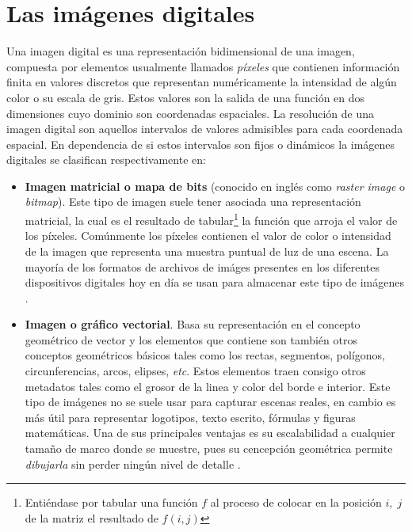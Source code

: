 \section{Las im\'agenes digitales}\label{sec:digital_images}
Una imagen digital \cite{solomon2011fundamentals,enwiki:di,eswiki:id} es una representaci\'on bidimensional de una imagen, compuesta por elementos usualmente llamados \textit{p\'ixeles} que contienen informaci\'on finita en valores discretos que representan num\'ericamente la intensidad de alg\'un color o su escala de gris. Estos valores son la salida de una funci\'on en dos dimensiones cuyo dominio son coordenadas espaciales. La resolución de una imagen digital son aquellos intervalos de valores admisibles para cada coordenada espacial. En dependencia de si estos intervalos son fijos o din\'amicos la im\'agenes digitales se clasifican respectivamente en:
\begin{itemize}
	\item \textbf{Imagen matricial o mapa de bits} (conocido en ingl\'es como \textit{raster image} o \textit{bitmap}). Este tipo de imagen suele tener asociada una representaci\'on matricial, la cual es el resultado de tabular\footnote{Entiéndase por tabular una funci\'on $f$ al proceso de colocar en la posici\'on $i,\;j$ de la matriz el resultado de $f(i, j)$} la funci\'on que arroja el valor de los p\'ixeles. Comúnmente los píxeles contienen el valor de color o intensidad de la imagen que representa una muestra puntual de luz de una escena. La mayor\'ia de los formatos de archivos de im\'ages presentes en los diferentes dispositivos digitales hoy en d\'ia se usan para almacenar este tipo de im\'agenes \cite{eswiki:imp}.
	\item \textbf{Imagen o gr\'afico vectorial}. Basa su representaci\'on en el concepto geom\'etrico de vector y los elementos que contiene son tambi\'en otros conceptos geom\'etricos b\'asicos tales como los rectas, segmentos, pol\'igonos, circunferencias, arcos, elipses, \textit{etc}. Estos elementos traen consigo otros metadatos tales como el grosor de la linea y color del borde e interior. Este tipo de im\'agenes no se suele usar para capturar escenas reales, en cambio es m\'as \'util para representar logotipos, texto escrito, f\'ormulas y figuras matem\'aticas. Una de sus principales ventajas es su escalabilidad a cualquier tamaño de marco donde se muestre, pues su cencepci\'on geom\'etrica permite \textit{dibujarla} sin perder ning\'un nivel de detalle \cite{eswiki:igv}.
\end{itemize}

